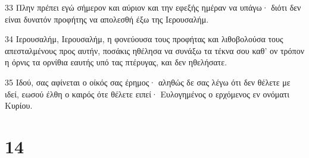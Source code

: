 \par 33 Πλην πρέπει εγώ σήμερον και αύριον και την εφεξής ημέραν να υπάγω· διότι δεν είναι δυνατόν προφήτης να απολεσθή έξω της Ιερουσαλήμ.
\par 34 Ιερουσαλήμ, Ιερουσαλήμ, η φονεύουσα τους προφήτας και λιθοβολούσα τους απεσταλμένους προς αυτήν, ποσάκις ηθέλησα να συνάξω τα τέκνα σου καθ' ον τρόπον η όρνις τα ορνίθια εαυτής υπό τας πτέρυγας, και δεν ηθελήσατε.
\par 35 Ιδού, σας αφίνεται ο οίκός σας έρημος· αληθώς δε σας λέγω ότι δεν θέλετε με ιδεί, εωσού έλθη ο καιρός ότε θέλετε ειπεί· Ευλογημένος ο ερχόμενος εν ονόματι Κυρίου.

\chapter{14}

